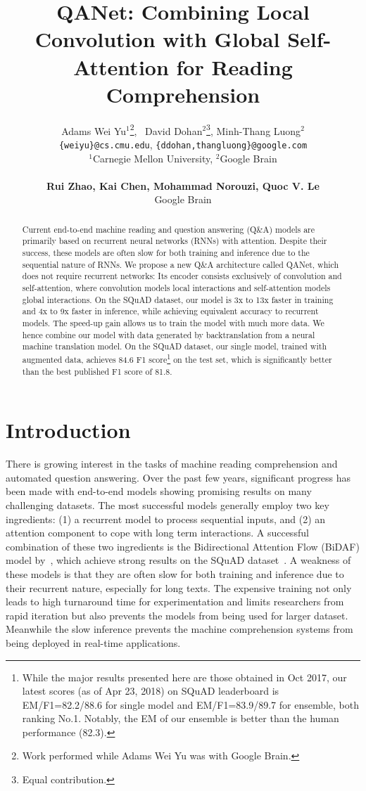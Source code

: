 \documentclass{article} \usepackage{iclr2018_conference,times}
\title{QANet: Combining Local Convolution with Global Self-Attention for Reading Comprehension}
\author{Adams Wei Yu$^{1}$\thanks{Work performed while Adams Wei Yu was with Google Brain.},
~David Dohan$^{2}$\thanks{Equal contribution.}, Minh-Thang Luong$^2$\samethanks[2]\\
\texttt{\{weiyu\}@cs.cmu.edu}, \texttt{\{ddohan,thangluong\}@google.com} \\
$^1$Carnegie Mellon University, $^2$Google Brain \\\\
\textbf{Rui Zhao, Kai Chen, Mohammad Norouzi, Quoc V. Le}\\
Google Brain \\
}
\begin{document}
\maketitle

\begin{abstract}
 Current end-to-end machine reading and question answering (Q\&A) models are primarily based on recurrent neural networks (RNNs) with attention. Despite their success, these models are often slow for both training and inference due to the sequential nature of RNNs. We propose a new Q\&A architecture called QANet, which does not require recurrent networks:  Its encoder consists exclusively of convolution and self-attention, where convolution models local interactions and self-attention models global interactions. On the SQuAD dataset, our model is 3x to 13x faster in training and 4x to 9x faster in inference, while achieving equivalent accuracy to recurrent models. The speed-up gain allows us to train the model with much more data. We hence  combine our model with data generated by backtranslation from a neural machine translation model.  
On the SQuAD dataset, our single model, trained with augmented data, achieves 84.6 F1 score\footnote{While the major results presented here are those obtained in Oct 2017, our latest scores (as of Apr 23, 2018) on SQuAD leaderboard is EM/F1=82.2/88.6 for single model and EM/F1=83.9/89.7 for ensemble, both ranking No.1. Notably, the EM of our ensemble is better than the human performance (82.3).} on the test set, which is significantly better than the best published F1 score of 81.8.

 \end{abstract}

\section{Introduction}\label{sec:intro}

There is growing interest in the tasks of machine reading comprehension and automated question answering. Over the past few years, significant progress has been made with end-to-end models showing promising results on many challenging datasets. The most successful models generally employ two key ingredients: (1) a recurrent model to process sequential inputs, and (2) an attention component to cope with long term interactions. A successful combination of these two ingredients is the Bidirectional Attention Flow (BiDAF) model by~\cite{SeoKFH16}, which achieve strong results on the SQuAD dataset~\citep{RajpurkarZLL16}.  A weakness of these models is that they are often slow for both training and inference due to their recurrent nature, especially for long texts. 
The expensive training not only leads to high turnaround time for experimentation and limits researchers from rapid iteration but also prevents the models from being used for larger dataset. Meanwhile the slow inference prevents the machine comprehension systems from being deployed in real-time applications.
\end{document}
